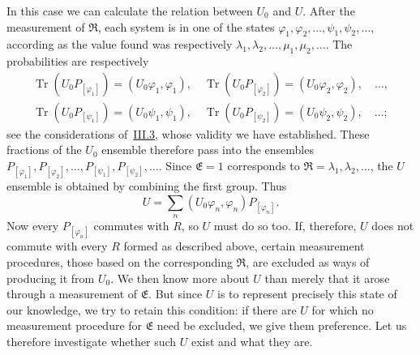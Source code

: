 \documentclass[fontsize=13pt,twoside,openany,headings=normal,parskip=false,bookmarkpackage=false,DIV=calc]{scrbook}
\begin{document}
In this case we can calculate the relation between $U_0$ and $U$. After the measurement of $\mathfrak R$, each system is in one of the states $\varphi_1,\varphi_2,\ldots,\psi_1,\psi_2,\ldots$, according as the value found was respectively $\lambda_1,\lambda_2,\ldots,\mu_1,\mu_2,\ldots$. The probabilities are respectively
\begin{gather*}
\operatorname{Tr}(U_0P_{[\varphi_1]})=(U_0\varphi_1,\varphi_1),\quad
\operatorname{Tr}(U_0P_{[\varphi_2]})=(U_0\varphi_2,\varphi_2),\quad\ldots,\\
\operatorname{Tr}(U_0P_{[\psi_1]})=(U_0\psi_1,\psi_1),\quad
\operatorname{Tr}(U_0P_{[\psi_2]})=(U_0\psi_2,\psi_2),\quad\ldots;
\end{gather*}
see the considerations of~\hyperref[sec:III.3]{III.3}, whose validity we have established. These fractions of the $U_0$ ensemble therefore pass into the ensembles $P_{[\varphi_1]},\allowbreak P_{[\varphi_2]},\allowbreak\ldots,\allowbreak P_{[\psi_1]},\allowbreak P_{[\psi_2]},\allowbreak\ldots$. Since $\mathfrak E=1$ corresponds to $\mathfrak R=\lambda_1,\lambda_2,\ldots$, the $U$ ensemble is obtained by combining the first group. Thus
\[
U=\sum_n(U_0\varphi_n,\varphi_n)P_{[\varphi_n]}.
\]
Now every $P_{[\varphi_n]}$ commutes with $R$, so $U$ must do so too. If, therefore, $U$ does not commute with every $R$ formed as described above, certain measurement procedures, those based on the corresponding $\mathfrak R$, are excluded as ways of producing it from $U_0$. We then know more about $U$ than merely that it arose through a measurement of $\mathfrak E$. But since $U$ is to represent precisely this state of our knowledge, we try to retain this condition: if there are $U$ for which no measurement procedure for $\mathfrak E$ need be excluded, we give them preference. Let us therefore investigate whether such $U$ exist and what they are.
\end{document}
